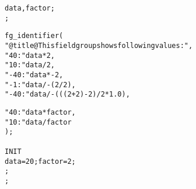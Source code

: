 \begin{boxedminipage}[t]{\linewidth}
\begin{alltt}
\DATAPOOL
  \REAL data, factor;
\END \DATAPOOL;

\UIMANAGER
  \FIELDGROUP fg_identifier (
    "@title@This fieldgroup shows following values:",
    " 40: " data * 2,
    " 10: " data / 2,
    "-40: " data * -2,
    " -1: " data / -(2/2),
    "-40: " data / -(((2+2)-2)/2*1.0),

    " 40: " data * factor,
    " 10: " data / factor
  );
\END \UIMANAGER

\FUNCTIONS
  \FUNC INIT {
    data = 20; factor = 2;
  };
\END \FUNCTIONS;

\end{alltt}
\end{boxedminipage}
